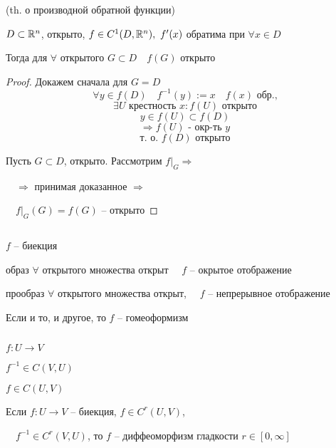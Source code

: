 



    
    \begin{corollary}
        (th. о производной обратной функции) \hfill {}
        \par $D \subset \mathbb{R}^n$,  открыто, $f \in C^1(D, \mathbb{R}^n), \ f'(x)$ обратима при $\forall x \in D$
        \par Тогда для $\forall$ открытого $G \subset D \quad f(G)$ открыто
    \end{corollary}
    \begin{proof}
        Докажем сначала для $G = D$
        \[ \forall y \in f(D) \quad f^{-1}(y) := x \quad f(x) \text{ обр.,} \]
        \[ \exists U \text{ крестность } x : f(U) \text{ открыто} \]
        \[ y \in f(U) \subset f(D) \]
        \[ \Rightarrow f(U) \text{ - окр-ть } y \]
        \[\text{т. о. } f(D) \text{ открыто}\]
        \par Пусть $G \subset D$, открыто. Рассмотрим $f\big|_G \Rightarrow$
        \par $\quad \Rightarrow$ принимая доказанное $\Rightarrow$
        \par $\quad f\big|_G(G) = f(G)$ -- открыто
    \end{proof}

    $ $
    \linebreak
    \par $f$ -- биекция
    \par образ $\forall$ открытого множества открыт $\quad f$ -- окрытое отображение
    \par прообраз $\forall$ открытого множества открыт, $\quad f$ -- непрерывное отображение

    \begin{definition}
        Если и то, и другое, то $f$ -- гомеоформизм
    \end{definition}

    $ $
    \par $f : U \rightarrow V$
    \par $f^{-1} \in C(V, U)$
    \par $f \in C(U, V)$

    \begin{definition}
        Если $f : U \rightarrow V$ -- биекция, $f \in C^r(U, V)$,
        \par $\quad f^{-1} \in C^r(V, U)$, то $f$ -- диффеоморфизм гладкости $r \in [0, \infty]$
    \end{definition}


